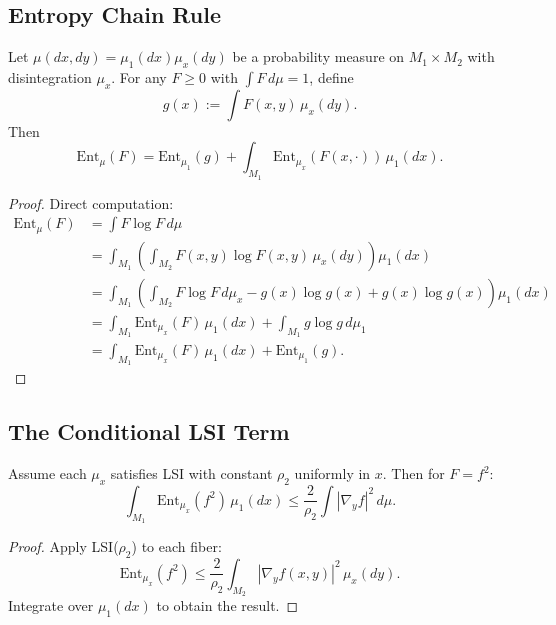 \subsection{Entropy Chain Rule}

\begin{lemma}\label{lem:entropy-chain}
Let $\mu(dx,dy) = \mu_1(dx) \mu_x(dy)$ be a probability measure on $M_1 \times M_2$ with disintegration $\mu_x$. For any $F \geq 0$ with $\int F \, d\mu = 1$, define
\begin{equation}
    g(x) := \int F(x,y) \, \mu_x(dy).
\end{equation}
Then
\begin{equation}
    \mathrm{Ent}_\mu(F) = \mathrm{Ent}_{\mu_1}(g) + \int_{M_1} \mathrm{Ent}_{\mu_x}(F(x,\cdot)) \, \mu_1(dx).
\end{equation}
\end{lemma}

\begin{proof}
Direct computation:
\begin{align}
    \mathrm{Ent}_\mu(F) &= \int F \log F \, d\mu \\
    &= \int_{M_1} \left( \int_{M_2} F(x,y) \log F(x,y) \, \mu_x(dy) \right) \mu_1(dx) \\
    &= \int_{M_1} \left( \int_{M_2} F \log F \, d\mu_x - g(x) \log g(x) + g(x) \log g(x) \right) \mu_1(dx) \\
    &= \int_{M_1} \mathrm{Ent}_{\mu_x}(F) \, \mu_1(dx) + \int_{M_1} g \log g \, d\mu_1 \\
    &= \int_{M_1} \mathrm{Ent}_{\mu_x}(F) \, \mu_1(dx) + \mathrm{Ent}_{\mu_1}(g).
\end{align}
\end{proof}

\subsection{The Conditional LSI Term}

\begin{lemma}\label{lem:conditional-term}
Assume each $\mu_x$ satisfies LSI with constant $\rho_2$ uniformly in $x$. Then for $F = f^2$:
\begin{equation}
    \int_{M_1} \mathrm{Ent}_{\mu_x}(f^2) \, \mu_1(dx) \leq \frac{2}{\rho_2} \int |\nabla_y f|^2 \, d\mu.
\end{equation}
\end{lemma}

\begin{proof}
Apply LSI($\rho_2$) to each fiber:
\begin{equation}
    \mathrm{Ent}_{\mu_x}(f^2) \leq \frac{2}{\rho_2} \int_{M_2} |\nabla_y f(x,y)|^2 \, \mu_x(dy).
\end{equation}
Integrate over $\mu_1(dx)$ to obtain the result.
\end{proof}

